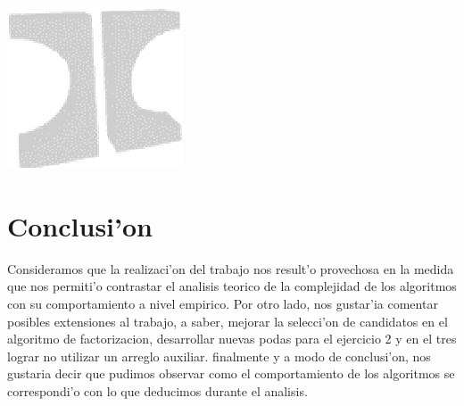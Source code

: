\documentclass[a4paper,spanish]{article}
\begin{document}
\includegraphics{logo.jpg}
\subtitulo{}



\maketitle
\tableofcontents




\part{Conclusi'on}
Consideramos que la realizaci'on del trabajo nos result'o provechosa en la medida que nos permiti'o contrastar el analisis teorico de la complejidad de los algoritmos con su comportamiento a nivel empirico.
Por otro lado, nos gustar'ia comentar posibles extensiones al trabajo, a saber, mejorar la selecci'on de candidatos en el algoritmo de factorizacion, desarrollar nuevas podas para el ejercicio 2 y en el tres lograr no utilizar un arreglo auxiliar. 
finalmente y a modo de conclusi'on, nos gustaria decir que pudimos observar como el comportamiento de los algoritmos se correspondi'o con lo que deducimos durante el analisis.
\label{LastPage}
\end{document}
